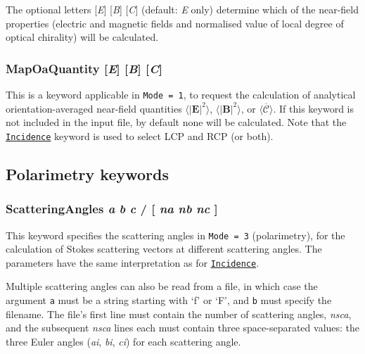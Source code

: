 \documentclass[
]{article}
\begin{document}
The optional letters {[}\emph{E}{]} {[}\emph{B}{]} {[}\emph{C}{]}
(default: \emph{E} only) determine which of the near-field properties
(electric and magnetic fields and normalised value of local degree of
optical chirality) will be calculated.

\hypertarget{mapoaquantity-e-b-c}{%
\subsubsection{\texorpdfstring{MapOaQuantity {[}\emph{E}{]}
{[}\emph{B}{]}
{[}\emph{C}{]}}{MapOaQuantity {[}E{]} {[}B{]} {[}C{]}}}\label{mapoaquantity-e-b-c}}

This is a keyword applicable in \texttt{Mode\ =\ 1}, to request the
calculation of analytical orientation-averaged near-field quantities
\(\langle|\mathbf{E}|^2\rangle\), \(\langle|\mathbf{B}|^2\rangle\), or
\(\langle\overline{\mathscr{C}}\rangle\). If this keyword is not
included in the input file, by default none will be calculated. Note
that the
\protect\hyperlink{incidence-a-b-c-p-na-nb-nc-}{\texttt{Incidence}}
keyword is used to select LCP and RCP (or both).

\hypertarget{polarimetry-keywords}{%
\subsection{Polarimetry keywords}\label{polarimetry-keywords}}

\hypertarget{scatteringangles-a-b-c-na-nb-nc}{%
\subsubsection{\texorpdfstring{ScatteringAngles \emph{a} \emph{b}
\emph{c} / {[} \emph{na} \emph{nb} \emph{nc}
{]}}{ScatteringAngles a b c / {[} na nb nc {]}}}\label{scatteringangles-a-b-c-na-nb-nc}}

This keyword specifies the scattering angles in \texttt{Mode\ =\ 3}
(polarimetry), for the calculation of Stokes scattering vectors at
different scattering angles. The parameters have the same interpretation
as for
\protect\hyperlink{incidence-a-b-c-p-na-nb-nc-}{\texttt{Incidence}}.

Multiple scattering angles can also be read from a file, in which case
the argument \texttt{a} must be a string starting with `f' or `F', and
\texttt{b} must specify the filename. The file's first line must contain
the number of scattering angles, \emph{nsca}, and the subsequent
\emph{nsca} lines each must contain three space-separated values: the
three Euler angles (\emph{ai}, \emph{bi}, \emph{ci}) for each scattering
angle.
\end{document}

